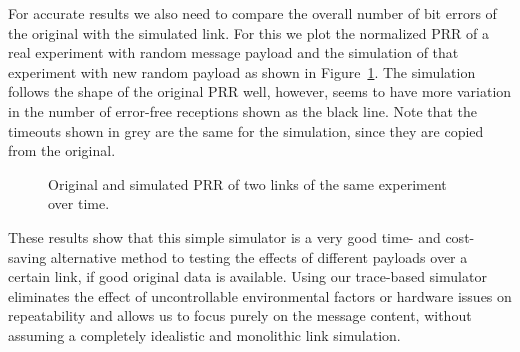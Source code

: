 For accurate results we also need to compare the overall number of bit errors of the original with the simulated link.
For this we plot the normalized \ac{PRR} of a real experiment with random message payload and the simulation of that experiment with new random payload as shown in Figure~\ref{fig:prr_simulation_comparison}.
The simulation follows the shape of the original \ac{PRR} well, however, seems to have more variation in the number of error-free receptions shown as the black line.
Note that the timeouts shown in grey are the same for the simulation, since they are copied from the original.

\begin{figure}[t]
	\caption{Original and simulated \acs{PRR} of two links of the same experiment over time.}
	\label{fig:prr_simulation_comparison}
\end{figure}

These results show that this simple simulator is a very good time- and cost-saving alternative method to testing the effects of different payloads over a certain link, if good original data is available.
Using our trace-based simulator eliminates the effect of uncontrollable environmental factors or hardware issues on repeatability and allows us to focus purely on the message content, without assuming a completely idealistic and monolithic link simulation.





















